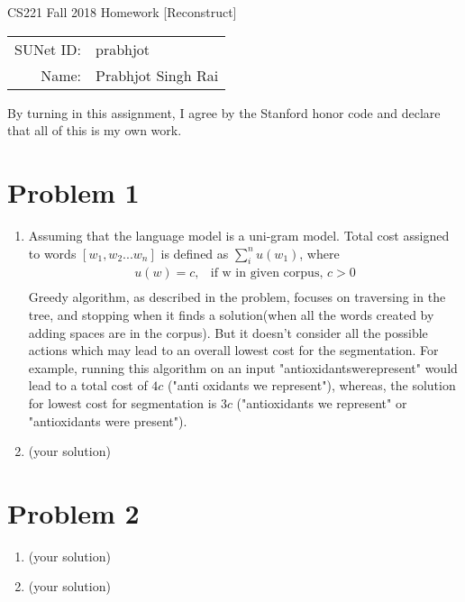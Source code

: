 \documentclass[12pt]{article}
\begin{document}
\begin{center}
{\Large CS221 Fall 2018 Homework [Reconstruct]}

\begin{tabular}{rl}
SUNet ID: & prabhjot \\
Name: & Prabhjot Singh Rai
\end{tabular}
\end{center}

By turning in this assignment, I agree by the Stanford honor code and declare
that all of this is my own work.

\section*{Problem 1}

\begin{enumerate}[label=(\alph*)]
  \item Assuming that the language model is a uni-gram model. Total cost assigned to words $[w_1, w_2 ... w_n]$ is defined as $\sum_{i}^n u(w_1)$, where \\
  \begin{align*}
  u(w) = c, & \text{if w in given corpus, $c > 0$} \\
  \end{align*}
    Greedy algorithm, as described in the problem, focuses on traversing in the tree, and stopping when it finds a solution(when all the words created by adding spaces are in the corpus). But it doesn't consider all the possible actions which may lead to an overall lowest cost for the segmentation. For example, running this algorithm on an input "antioxidantswerepresent" would lead to a total cost of $4c$ ("anti oxidants we represent"), whereas, the solution for lowest cost for segmentation is $3c$ ("antioxidants we represent" or "antioxidants were present").
    
    
  \item (your solution)
  
  
\end{enumerate}

\section*{Problem 2}

\begin{enumerate}[label=(\alph*)]
  \item (your solution)
  \item (your solution)
\end{enumerate}
\end{document}
